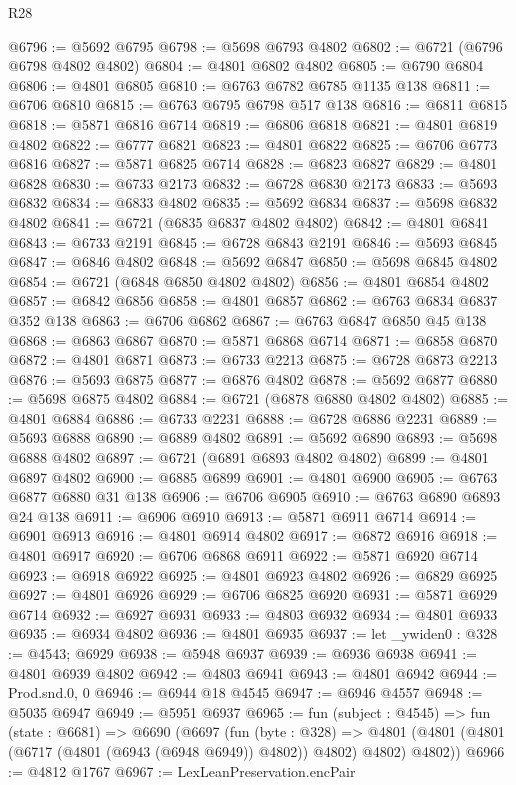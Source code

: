 \begin{lexlean}{R28}
\begin{coremodule}
@6796 := @5692 @6795
@6798 := @5698 @6793 @4802
@6802 := @6721 (@6796 @6798 @4802 @4802)
@6804 := @4801 @6802 @4802
@6805 := @6790 @6804
@6806 := @4801 @6805
@6810 := @6763 @6782 @6785 @1135 @138
@6811 := @6706 @6810
@6815 := @6763 @6795 @6798 @517 @138
@6816 := @6811 @6815
@6818 := @5871 @6816 @6714
@6819 := @6806 @6818
@6821 := @4801 @6819 @4802
@6822 := @6777 @6821
@6823 := @4801 @6822
@6825 := @6706 @6773 @6816
@6827 := @5871 @6825 @6714
@6828 := @6823 @6827
@6829 := @4801 @6828
@6830 := @6733 @2173
@6832 := @6728 @6830 @2173
@6833 := @5693 @6832
@6834 := @6833 @4802
@6835 := @5692 @6834
@6837 := @5698 @6832 @4802
@6841 := @6721 (@6835 @6837 @4802 @4802)
@6842 := @4801 @6841
@6843 := @6733 @2191
@6845 := @6728 @6843 @2191
@6846 := @5693 @6845
@6847 := @6846 @4802
@6848 := @5692 @6847
@6850 := @5698 @6845 @4802
@6854 := @6721 (@6848 @6850 @4802 @4802)
@6856 := @4801 @6854 @4802
@6857 := @6842 @6856
@6858 := @4801 @6857
@6862 := @6763 @6834 @6837 @352 @138
@6863 := @6706 @6862
@6867 := @6763 @6847 @6850 @45 @138
@6868 := @6863 @6867
@6870 := @5871 @6868 @6714
@6871 := @6858 @6870
@6872 := @4801 @6871
@6873 := @6733 @2213
@6875 := @6728 @6873 @2213
@6876 := @5693 @6875
@6877 := @6876 @4802
@6878 := @5692 @6877
@6880 := @5698 @6875 @4802
@6884 := @6721 (@6878 @6880 @4802 @4802)
@6885 := @4801 @6884
@6886 := @6733 @2231
@6888 := @6728 @6886 @2231
@6889 := @5693 @6888
@6890 := @6889 @4802
@6891 := @5692 @6890
@6893 := @5698 @6888 @4802
@6897 := @6721 (@6891 @6893 @4802 @4802)
@6899 := @4801 @6897 @4802
@6900 := @6885 @6899
@6901 := @4801 @6900
@6905 := @6763 @6877 @6880 @31 @138
@6906 := @6706 @6905
@6910 := @6763 @6890 @6893 @24 @138
@6911 := @6906 @6910
@6913 := @5871 @6911 @6714
@6914 := @6901 @6913
@6916 := @4801 @6914 @4802
@6917 := @6872 @6916
@6918 := @4801 @6917
@6920 := @6706 @6868 @6911
@6922 := @5871 @6920 @6714
@6923 := @6918 @6922
@6925 := @4801 @6923 @4802
@6926 := @6829 @6925
@6927 := @4801 @6926
@6929 := @6706 @6825 @6920
@6931 := @5871 @6929 @6714
@6932 := @6927 @6931
@6933 := @4803 @6932
@6934 := @4801 @6933
@6935 := @6934 @4802
@6936 := @4801 @6935
@6937 := let _ywiden0 : @328 := @4543; @6929
@6938 := @5948 @6937
@6939 := @6936 @6938
@6941 := @4801 @6939 @4802
@6942 := @4803 @6941
@6943 := @4801 @6942
@6944 := Prod.snd.{0, 0}
@6946 := @6944 @18 @4545
@6947 := @6946 @4557
@6948 := @5035 @6947
@6949 := @5951 @6937
@6965 := fun (subject : @4545) =>
  fun (state : @6681) =>
  @6690
    (@6697
      (fun (byte : @328) =>
      @4801 (@4801 (@4801 (@6717 (@4801 (@6943 (@6948 @6949)) @4802)) @4802) @4802) @4802))
@6966 := @4812 @1767
@6967 := LexLeanPreservation.encPair

\end{coremodule}
\end{lexlean}
